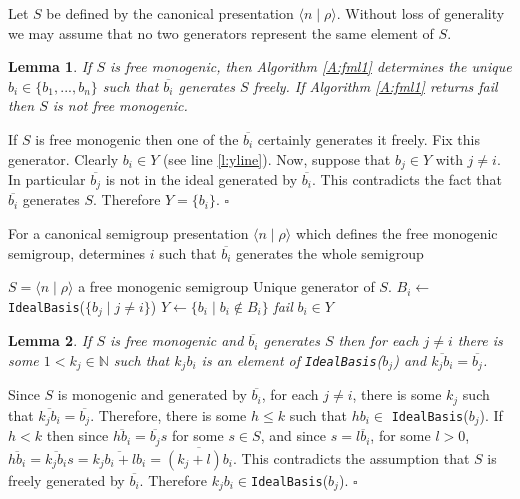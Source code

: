 \documentclass[12pt]{article}
\newtheorem{lemma}{Lemma}
\newenvironment{proof}{{\it Proof.\/}}{$\square$\\}
\begin{document}
Let $S$ be defined by the canonical presentation 
$\langle n \mid \rho \rangle$. Without loss of 
generality we may assume that no two generators 
represent the same element of $S$.

\begin{lemma}
If $S$ is free monogenic, then Algorithm \ref{A:fml1} determines
the unique $b_i\in\{b_1, ..., b_n\}$ such that $\overline{b_i}$ generates 
$S$ freely. If Algorithm \ref{A:fml1} returns \emph{fail} then
$S$ is not free monogenic.
\end{lemma}

\begin{proof}
If $S$ is free monogenic then
one of the $\overline{b_i}$ certainly generates it freely. Fix this generator.
Clearly $b_i\in Y$ (see line \ref{l:yline}). Now, suppose that $b_j\in Y$
with $j\neq i$. In particular $\overline{b_j}$ is not in the ideal generated
by $\overline{b_i}$. This contradicts the fact that $\overline{b_i}$ generates
$S$. Therefore $Y=\{b_i\}$. 
\end{proof}

\begin{algorithm}
\caption{For a canonical semigroup presentation $\langle n \mid \rho \rangle$ 
which defines the free monogenic semigroup, determines $i$ such that
$\overline{b_i}$ generates the whole semigroup}
\label{A:fml1}
\begin{algorithmic}[1]
\REQUIRE $S = \langle n \mid \rho \rangle$  a free monogenic semigroup
\ENSURE Unique generator of $S$.
        \STATE $B_i\leftarrow$ {\tt IdealBasis}($\{b_j \mid j \neq i\}$)
\ENDFOR
\STATE $Y\leftarrow \{b_i\mid b_i\notin B_i\}$ \label{l:yline}
 \emph{fail}
\ELSE 
{} $b_i\in Y$
\ENDIF
\end{algorithmic}
\end{algorithm}

\begin{lemma}\label{l:freegen}
If $S$ is free monogenic and $\overline{b_i}$ generates $S$ then for each
$j \neq i$ there is some $1 < k_j \in \mathbb{N}$
such that $k_j b_i$ is  an element of {\tt IdealBasis}($b_j$)
and $\overline{k_jb_i} = \overline{b_j}$.
\end{lemma}

\begin{proof}
Since $S$ is monogenic and generated by $\overline{b_i}$, for
each $j \neq i$, there is some $k_j$ such 
that $\overline{k_j b_i} = \overline{b_j}$. Therefore, there is some
$h \leq k$ such that $h b_i \in $ {\tt IdealBasis}($b_j$). 
If $h < k$ then since $\overline{hb_i}  = \overline{b_j} s$ 
for some $s \in S$, and since $s = \overline{lb_i}$, for some $l>0$,
$\overline{hb_i} = \overline{k_jb_i}s = \overline{k_jb_i + lb_i}
= \overline{(k_j + l)b_i}$. This contradicts the assumption that $S$ is  
freely generated by $\overline{b_i}$. 
Therefore $k_jb_i \in ${\tt IdealBasis}($b_j$).
\end{proof}
\end{document}

